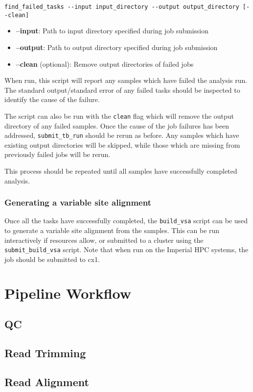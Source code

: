 \documentclass[a4paper,10pt,twoside]{article}
\begin{document}
\begin{verbatim}
find_failed_tasks --input input_directory --output output_directory [--clean]
\end{verbatim}

\begin{itemize}
\item \textbf{--input}: Path to input directory specified during job submission
\item \textbf{--output}: Path to output directory specified during job submission
\item \textbf{--clean} (optional): Remove output directories of failed jobs
\end{itemize}

When run, this script will report any samples which have failed the analysis
run. The standard output/standard error of any failed tasks should be inspected
to identify the cause of the failure. 

The script can also be run with the {\tt clean} flag which will remove the
output directory of any failed samples. Once the cause of the job failures has
been addressed, {\tt submit\_tb\_run} should be rerun as before. Any samples which
have existing output directories will be skipped, while those which are missing
from previously failed jobs will be rerun. 

This process should be repeated until all samples have successfully completed analysis.

\subsubsection{Generating a variable site alignment}

Once all the tasks have successfully completed, the {\tt build\_vsa} script can
be used to generate a variable site alignment from the samples. This can be run
interactively if resources allow, or submitted to a cluster using the {\tt
submit\_build\_vsa} script. Note that when run on the Imperial HPC systems, the
job should be submitted to cx1.


\section{Pipeline Workflow}

\subsection{QC}

\subsection{Read Trimming}

\subsection{Read Alignment}
\end{document}
